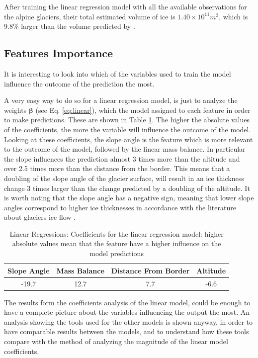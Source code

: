 After training the linear regression model with all the available observations for the alpine glaciers, their total estimated volume of ice  is $1.40 \times 10^{11}m^3$, which is 9.8\% larger than the volume predicted by \citet{Farinotti2019}.


\subsection{Features Importance}  

It is interesting to look into which of the variables used to train the model influence the outcome of the prediction the most.

A very easy way to do so for a linear regression model, is just to analyze the weights $\bm{\beta}$ (see Eq. \ref{eq:linear}), which the model assigned to each feature in order to make predictions. These are shown in Table \ref{tb:lr-coef}.
The higher the absolute values of the coefficients, the more the variable will influence the outcome of the model. Looking at these coefficients, the slope angle is the feature which is more relevant to the outcome of the model, followed by the linear mass balance. In particular the slope influences the prediction almost 3 times more than the altitude and over 2.5 times more than the distance from the border. This means that a doubling of the slope angle of the glacier surface, will result in an ice thickness change 3 times larger than the change predicted by a doubling of the altitude. It is worth noting that the slope angle has a negative sign, meaning that lower slope angles correspond to higher ice thicknesses in accordance with the literature about glaciers ice flow \cite[P. 298]{cuffey2010physics}.

\begin{table}
	\centering
	\caption{Linear Regressions: Coefficients for the linear regression model: higher absolute values mean that the feature have a higher influence on the model predictions}
	\begin{tabular}{|c|c|c|c|}
		\hline 
		Slope Angle&Mass Balance&Distance From Border&Altitude \\
		\hline
		-19.7&12.7&7.7&-6.6 \\
		\hline
	\end{tabular}
	\label{tb:lr-coef}
\end{table}

The results form the coefficients analysis of the linear model, could be enough to have a complete picture about the variables influencing the output the most. An analysis showing the tools used for the other models is shown anyway, in order to have comparable results between the models, and to understand how these tools compare with the method of analyzing the magnitude of the linear model coefficients. 

